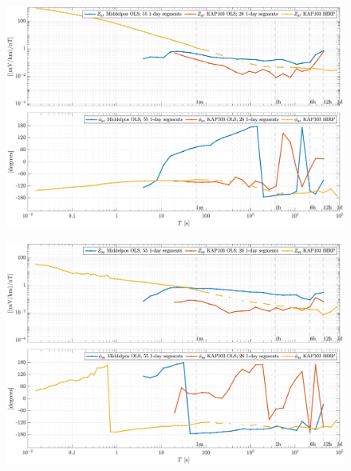 \documentclass{article}
\begin{document}
\clearpage

\begin{figure}[h!]
\centering
\includegraphics[width=\textwidth]{figures/KAP103_Middelpos/transferfnZ_compare-Z_yx_Magnitude_Phase.pdf}
\caption{}
\label{fig:universe}
\end{figure}

\begin{figure}[h!]
\centering
\includegraphics[width=\textwidth]{figures/KAP103_Middelpos/transferfnZ_compare-Z_yy_Magnitude_Phase.pdf}
\caption{}
\label{fig:universe}
\end{figure}

\clearpage
\end{document}
